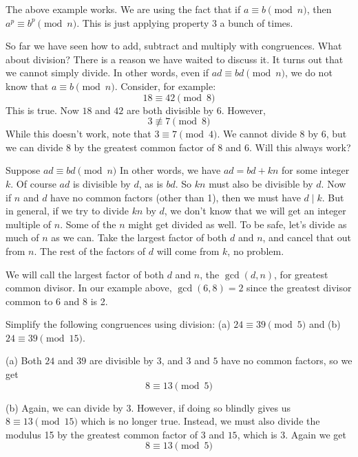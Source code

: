 \documentclass[12pt]{article}
\begin{document}
The above example works.  We are using the fact that if $a \equiv b \pmod n$, then $a^p \equiv b^p \pmod n$.  This is just applying property 3 a bunch of times.

So far we have seen how to add, subtract and multiply with congruences.  What about division?  There is a reason we have waited to discuss it.  It turns out that we cannot simply divide.  In other words, even if $ad \equiv bd \pmod n$, we do not know that $a \equiv b \pmod n$.  Consider, for example:
\[18 \equiv 42 \pmod 8\]
This is true.  Now $18$ and $42$ are both divisible by 6.  However,
\[3 \not\equiv 7 \pmod 8\]
While this doesn't work, note that $3 \equiv 7 \pmod 4$.  We cannot divide $8$ by 6, but we can divide 8 by the greatest common factor of $8$ and $6$.  Will this always work?

Suppose $ad \equiv bd \pmod n$  In other words, we have $ad = bd + kn$ for some integer $k$.  Of course $ad$ is divisible by $d$, as is $bd$.  So $kn$ must also be divisible by $d$.  Now if $n$ and $d$ have no common factors (other than 1), then we must have $d \mid k$.  But in general, if we try to divide $kn$ by $d$, we don't know that we will get an integer multiple of $n$.  Some of the $n$ might get divided as well.  To be safe, let's divide as much of $n$ as we can.  Take the largest factor of both $d$ and $n$, and cancel that out from $n$.  The rest of the factors of $d$ will come from $k$, no problem.

We will call the largest factor of both $d$ and $n$, the $\gcd(d,n)$, for greatest common divisor.  In our example above, $\gcd(6,8) = 2$ since the greatest divisor common to 6 and 8 is 2.


\begin{example}
 Simplify the following congruences using division: (a) $24 \equiv 39 \pmod 5$ and (b) $24 \equiv 39 \pmod{15}$.
 
 \begin{solution}
	(a) Both $24$ and $39$ are divisible by $3$, and $3$ and $5$ have no common factors, so we get
	\[8 \equiv 13 \pmod 5\]
	
	(b) Again, we can divide by 3.  However, if doing so blindly gives us $8 \equiv 13 \pmod{15}$ which is no longer true.  Instead, we must also divide the modulus 15 by the greatest common factor of $3$ and $15$, which is $3$.  Again we get
	\[8 \equiv 13 \pmod 5\]
 \end{solution}
\end{example}
\end{document}
